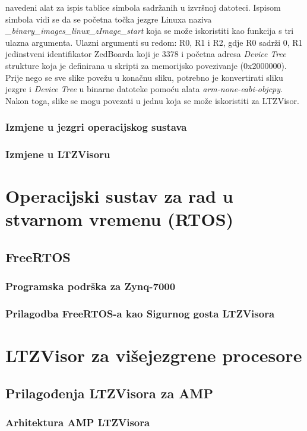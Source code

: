 \documentclass[times, utf8, diplomski, numeric]{fer}
\begin{document}
navedeni alat za ispis tablice simbola sadržanih u izvršnoj datoteci. Ispisom simbola vidi se da se početna točka jezgre
Linuxa naziva \textit{\_binary\_images\_linux\_zImage\_start} koja se može iskoristiti kao funkcija s tri ulazna argumenta.
Ulazni argumenti su redom: R0, R1 i R2, gdje R0 sadrži 0, R1 jedinstveni identifikator ZedBoarda koji je 3378 i početna adresa
\textit{Device Tree} strukture koja je definirana u skripti za memorijsko povezivanje (0x2000000). Prije nego se sve slike
povežu u konačnu sliku, potrebno je konvertirati sliku jezgre i \textit{Device Tree} u binarne datoteke pomoću alata
\textit{arm-none-eabi-objcpy}. Nakon toga, slike se mogu povezati u jednu koja se može iskoristiti za LTZVisor.

\subsection{Izmjene u jezgri operacijskog sustava}
\subsection{Izmjene u LTZVisoru}

\chapter{Operacijski sustav za rad u stvarnom vremenu (RTOS)}
\section{FreeRTOS}
\subsection{Programska podrška za Zynq-7000}
\subsection{Prilagodba FreeRTOS-a kao Sigurnog gosta LTZVisora}

\chapter{LTZVisor za višejezgrene procesore}
\section{Prilagođenja LTZVisora za AMP}
\subsection{Arhitektura AMP LTZVisora}
\end{document}
